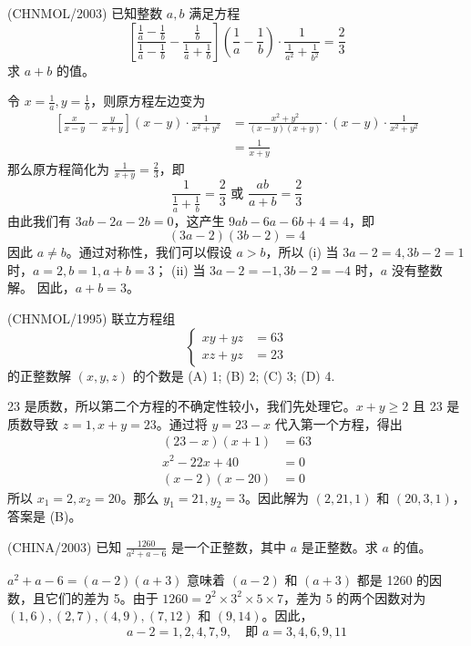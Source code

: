 \begin{questions}
\question (CHNMOL/2003) 已知整数 $a, b$ 满足方程
\[
\left[ \frac{\frac{1}{a} - \frac{1}{b}}{\frac{1}{a} - \frac{1}{b}} - \frac{\frac{1}{b}}{\frac{1}{a} + \frac{1}{b}} \right] \left( \frac{1}{a} - \frac{1}{b} \right) \cdot \frac{1}{\frac{1}{a^2} + \frac{1}{b^2}} = \frac{2}{3}
\]
求 $a+b$ 的值。

\begin{solution}
令 $x=\frac{1}{a}, y=\frac{1}{b}$，则原方程左边变为
\begin{align*}
\left[ \frac{x}{x-y} - \frac{y}{x+y} \right] (x-y) \cdot \frac{1}{x^2+y^2} &= \frac{x^2+y^2}{(x-y)(x+y)} \cdot (x-y) \cdot \frac{1}{x^2+y^2} \\
&= \frac{1}{x+y}
\end{align*}
那么原方程简化为 $\frac{1}{x+y} = \frac{2}{3}$，即
\[
\frac{1}{\frac{1}{a}+\frac{1}{b}} = \frac{2}{3} \text{ 或 } \frac{ab}{a+b} = \frac{2}{3}
\]
由此我们有 $3ab-2a-2b=0$，这产生 $9ab-6a-6b+4=4$，即
\[
(3a-2)(3b-2)=4
\]
因此 $a \neq b$。通过对称性，我们可以假设 $a>b$，所以
(i) 当 $3a-2=4, 3b-2=1$ 时，$a=2, b=1, a+b=3$；
(ii) 当 $3a-2=-1, 3b-2=-4$ 时，$a$ 没有整数解。
因此，$a+b=3$。
\end{solution}

\question (CHNMOL/1995) 联立方程组
\[
\begin{cases}
xy+yz &= 63 \\
xz+yz &= 23
\end{cases}
\]
的正整数解 $(x,y,z)$ 的个数是
(A) 1; \quad (B) 2; \quad (C) 3; \quad (D) 4.

\begin{solution}
23 是质数，所以第二个方程的不确定性较小，我们先处理它。$x+y \ge 2$ 且 23 是质数导致 $z=1, x+y=23$。通过将 $y=23-x$ 代入第一个方程，得出
\begin{align*}
(23-x)(x+1) &= 63 \\
x^2-22x+40 &= 0 \\
(x-2)(x-20) &= 0
\end{align*}
所以 $x_1=2, x_2=20$。那么 $y_1=21, y_2=3$。因此解为 $(2, 21, 1)$ 和 $(20, 3, 1)$，答案是 (B)。
\end{solution}

\question (CHINA/2003) 已知 $\frac{1260}{a^2+a-6}$ 是一个正整数，其中 $a$ 是正整数。求 $a$ 的值。

\begin{solution}
$a^2+a-6=(a-2)(a+3)$ 意味着 $(a-2)$ 和 $(a+3)$ 都是 1260 的因数，且它们的差为 5。由于 $1260=2^2 \times 3^2 \times 5 \times 7$，差为 5 的两个因数对为 $(1,6), (2,7), (4,9), (7,12)$ 和 $(9,14)$。因此，
\[
a-2=1, 2, 4, 7, 9, \quad \text{即 } a=3, 4, 6, 9, 11
\]
\end{solution}


\end{questions}
